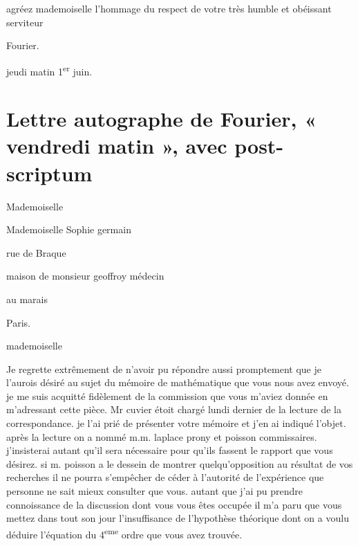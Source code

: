 \documentclass[11pt,a4paper]{article}
\begin{document}

agréez mademoiselle l'hommage du respect de votre très humble et obéissant
serviteur

Fourier.

jeudi matin 1\textsuperscript{er} juin.

\section{Lettre autographe de Fourier, « vendredi matin », avec post-scriptum}

Mademoiselle

Mademoiselle Sophie germain

rue de Braque

maison de monsieur geoffroy médecin

au marais

Paris.


mademoiselle

Je regrette extrêmement de n'avoir pu répondre aussi promptement que je
l'aurois désiré au sujet du mémoire de mathématique que vous nous avez envoyé.
je me suis acquitté fidèlement de la commission que vous m'aviez donnée en
m'adressant cette pièce. Mr cuvier étoit chargé lundi dernier de la lecture de
la correspondance. je l'ai prié de présenter votre mémoire et j'en ai indiqué
l'objet. après la lecture on a nommé m.m. laplace prony et poisson
commissaires. j'insisterai autant qu'il sera nécessaire pour qu'ils fassent
le rapport que vous désirez. si m. poisson a le dessein de montrer
quelqu'opposition au résultat de vos recherches il ne pourra s'empêcher de
céder à l'autorité de l'expérience que personne ne sait mieux consulter que
vous. autant que j'ai pu prendre connoissance de la discussion dont vous vous
êtes occupée il m'a paru que vous mettez dans tout son jour l'insuffisance de
l'hypothèse théorique dont on a voulu déduire l'équation du
4\textsuperscript{eme} ordre que vous avez trouvée.

\end{document}
